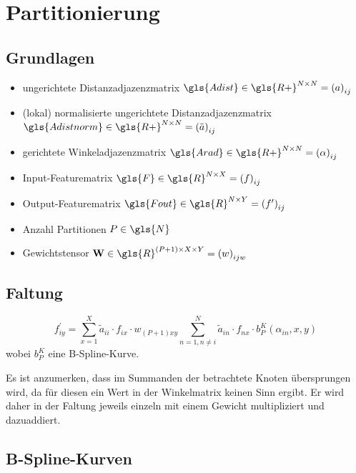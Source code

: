 \section{Partitionierung}



\subsection{Grundlagen}

\begin{itemize}
  \item ungerichtete Distanzadjazenzmatrix $\gls{Adist} \in \gls{R+}^{N \times N} = {\left(a\right)}_{ij}$
  \item (lokal) normalisierte ungerichtete Distanzadjazenzmatrix $\gls{Adistnorm} \in \gls{R+}^{N \times N} = {\left(\tilde a\right)}_{ij}$
  \item gerichtete Winkeladjazenzmatrix $\gls{Arad} \in \gls{R+}^{N \times N} = {\left(\alpha\right)}_{ij}$
  \item Input-Featurematrix $\gls{F} \in \gls{R}^{N \times X} = {\left(f\right)}_{ij}$
  \item Output-Featurematrix $\gls{Fout} \in \gls{R}^{N \times Y} = {\left(f^{\prime}\right)}_{ij}$
  \item Anzahl Partitionen $P \in \gls{N}$
  \item Gewichtstensor $\ma{W} \in \gls{R}^{\left(P + 1\right) \times X \times Y} = {\left(w\right)}_{ijw}$
\end{itemize}

\subsection{Faltung}

\begin{equation}
  f^{\prime}_{iy} = \sum_{x = 1}^X \tilde a_{ii} \cdot f_{ix} \cdot w_{\left(P +1\right)xy} \sum_{n = 1, n \neq i}^N \tilde a_{in} \cdot f_{nx} \cdot b^K_P\left(\alpha_{in}, x, y\right)
\end{equation}
wobei $b_P^K$ eine B-Spline-Kurve.

Es ist anzumerken, dass im Summanden der betrachtete Knoten übersprungen wird, da für diesen ein Wert in der Winkelmatrix keinen Sinn ergibt.
Er wird daher in der Faltung jeweils einzeln mit einem Gewicht multipliziert und dazuaddiert.

\subsection{B-Spline-Kurven}

